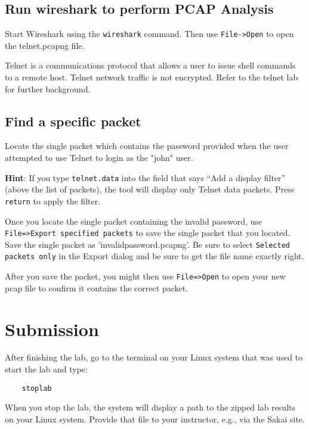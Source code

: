 \subsection{Run wireshark to perform PCAP Analysis}

Start Wireshark using the {\tt wireshark} command.  Then use {\tt File->Open} to open the telnet.pcapng file.

Telnet is a communications protocol that allows a user to 
issue shell commands to a remote host. Telnet network 
traffic is not encrypted. Refer to the telnet lab for further background.

\subsection{Find a specific packet}

Locate the single packet which contains the password provided when the user attempted to use Telnet to login as the "john" user. 


\textbf{Hint}: If you type {\tt telnet.data} into the field that says ``Add a display filter'' (above the list of packets), the
tool will display only Telnet data packets.  Press {\tt return} to apply the filter.

Once you locate the single packet containing the invalid password, use {\tt File=>Export specified packets} to save the single
packet that you located.  Save the single packet as 'invalidpassword.pcapng'.  Be sure to select {\tt Selected packets only} in the Export dialog and be sure to get the file name exactly right.

After you save the packet, you might then use {\tt File=>Open} to open your new pcap file to confirm it contains the correct packet.

\section{Submission}
After finishing the lab, go to the terminal on your Linux system that was used to start the lab and type:
\begin{verbatim}
    stoplab 
\end{verbatim}
When you stop the lab, the system will display a path to the zipped lab results on your Linux system.  Provide that file to 
your instructor, e.g., via the Sakai site.

\copyrightnotice


